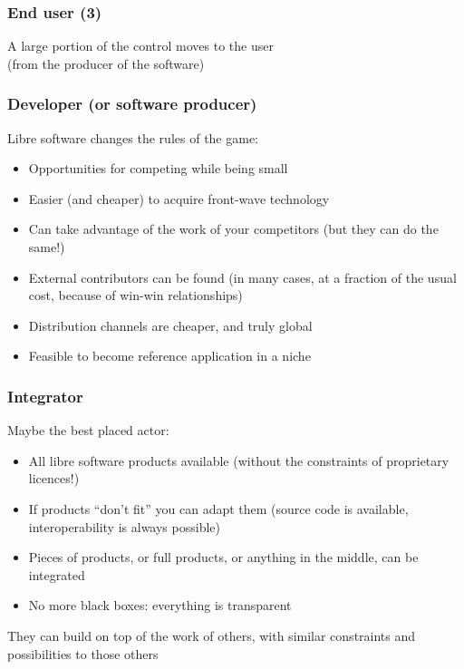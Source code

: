 \documentclass{beamer}
\begin{document}

\begin{frame}
\frametitle{End user (3)}

\begin{center}
{\LARGE A large portion of the control moves to the user \\
(from the producer of the software)}
\end{center}
\end{frame}


\begin{frame}
\frametitle{Developer (or software producer)}

Libre software changes the rules of the game:

\begin{itemize}
\item Opportunities for competing while being small
\item Easier (and cheaper) to acquire front-wave technology
\item Can take advantage of the work of your competitors (but they can do the same!)
\item External contributors can be found (in many cases, at a fraction of the usual cost, because of win-win relationships)
\item Distribution channels are cheaper, and truly global
\item Feasible to become reference application in a niche
\end{itemize}
\end{frame}


\begin{frame}
\frametitle{Integrator}

Maybe the best placed actor:

\begin{itemize}
\item All libre software products available (without the constraints of proprietary licences!)
\item If products ``don't fit'' you can adapt them (source code is available, interoperability is always possible)
\item Pieces of products, or full products, or anything in the middle, can be integrated
\item No more black boxes: everything is transparent
\end{itemize}

\begin{center}
{\large They can build on top of the work of others, with similar constraints and possibilities to those others}
\end{center}
\end{frame}
\end{document}
